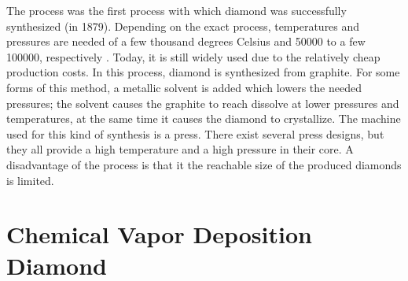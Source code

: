 	The \HPHT process was the first process with which diamond was successfully synthesized (in 1879).
	Depending on the exact process, temperatures and pressures are needed of a few thousand degrees Celsius and  \num{50000} to a few \num{100000}, respectively \cite{davis1993diamond}.
	Today, it is still widely used due to the relatively cheap production costs\cite{wikiSyntheticDiamond}.
	In this process, diamond is synthesized from graphite.
	For some forms of this method, a metallic solvent is added which lowers the needed pressures; the solvent causes the graphite to reach dissolve at lower pressures and temperatures, at the same time it causes the diamond to crystallize.
	The machine used for this kind of synthesis is a press.
	There exist several press designs, but they all provide a high temperature and a high pressure in their core.
	A disadvantage of the \HPHT process is that it the reachable size of the produced diamonds is limited.


	\section[CVD]{Chemical Vapor Deposition Diamond}\label{sec::cvd}

	\begin{figure}[tp]
		\begin{subfigure}[t]{ 0.49\linewidth}
			\caption{}\label{subfig::cvd_large}
			\centering
		\end{subfigure}
		\hfill
		\begin{subfigure}[t]{ 0.49\linewidth}
			\caption{}\label{subfig::cvd_detail}
			\centering
		\end{subfigure}
		\caption{}
		\label{fig::sem_cvd}
	\end{figure}

